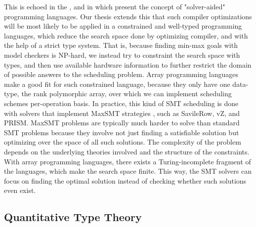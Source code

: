 \documentclass[10pt,a4paper]{article}
\begin{document}
This is echoed in the \cite{doctoral_thesis_mogers}, and in \cite{ALightweightSTorlak2014, GrowingSolverTorlak2013} which present the concept of "solver-aided" programming languages.
Our thesis extends this that such compiler optimizations will be most likely to be applied in a constrained and well-typed programming languages, which reduce the search space done by optimizing compiler, and with the help of a strict type system.
That is, because finding min-max goals with model checkers is NP-hard, we instead try to constraint the search space with types, and then use available hardware information to further restrict the domain of possible answers to the scheduling problem.
Array programming languages make a good fit for such constrained language, because they only have one data-type, the rank polymorphic array, over which we can implement scheduling schemes per-operation basis.
In practice, this kind of SMT scheduling is done with solvers that implement MaxSMT strategies \cite{IncrementalMaxNiskan2022}, such as SavileRow, vZ, and PRISM.
MaxSMT problems are typically much harder to solve than standard SMT problems because they involve not just finding a satisfiable solution but optimizing over the space of all such solutions. The complexity of the problem depends on the underlying theories involved and the structure of the constraints.
With array programming languages, there exists a Turing-incomplete fragment of the languages, which make the search space finite.
This way, the SMT solvers can focus on finding the optimal solution instead of checking whether such solutions even exist.

\subsection{Quantitative Type Theory}
\end{document}
